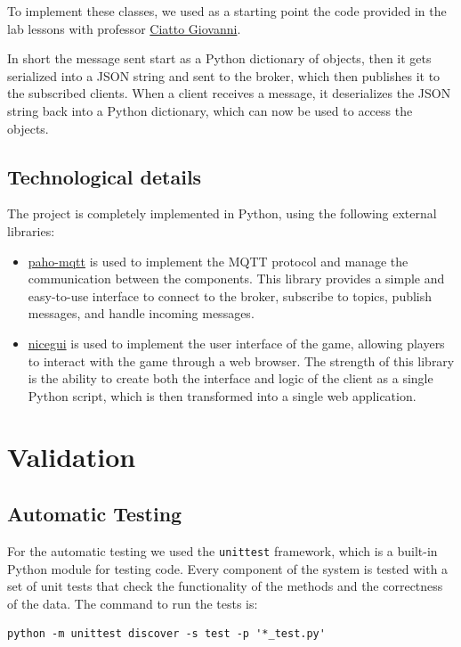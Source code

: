 \documentclass{scrartcl}
\begin{document}
To implement these classes, we used as a starting point the code provided in the lab lessons with professor
\href{https://www.unibo.it/sitoweb/giovanni.ciatto}{Ciatto Giovanni}.

In short the message sent start as a Python dictionary of objects, then it gets serialized into a 
JSON string and sent to the broker, which then publishes it to the subscribed clients.
When a client receives a message, it deserializes the JSON string back into a Python dictionary, 
which can now be used to access the objects.

\subsection{Technological details}\label{technological-details}
The project is completely implemented in Python, using the following external libraries:
\begin{itemize}
      \item \href{https://pypi.org/project/paho-mqtt/}{paho-mqtt} is used to implement the MQTT 
            protocol and manage the communication between the components. This library provides a 
            simple and easy-to-use interface to connect to the broker, subscribe to topics, publish 
            messages, and handle incoming messages.
      \item \href{https://nicegui.io/}{nicegui} is used to implement the user interface of the game, 
            allowing players to interact with the game through a web browser. The strength of this 
            library is the ability to create both the interface and logic of the client as a single 
            Python script, which is then transformed into a single web application.
\end{itemize}

\newpage
\section{Validation}\label{validation}
\subsection{Automatic Testing}\label{automatic-testing}
For the automatic testing we used the \texttt{unittest} framework, which is a built-in Python module 
for testing code. Every component of the system is tested with a set of unit tests that check the 
functionality of the methods and the correctness of the data.
The command to run the tests is:
\begin{verbatim}
python -m unittest discover -s test -p '*_test.py'
\end{verbatim}
\end{document}
